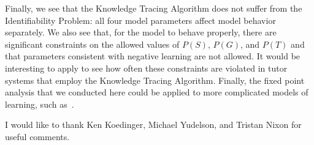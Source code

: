 \documentclass{acmlarge-edm}
\begin{document}
Finally, we see that the Knowledge Tracing Algorithm does not suffer from
the Identifiability Problem:  all four model parameters
affect model behavior separately.  
We also see that, for the model to behave properly,  there are 
significant constraints on the allowed values of $P(S)$, $P(G)$, and $P(T)$
and that parameters consistent with negative learning are not allowed.
It would be interesting to apply to see how often these constraints are
violated in tutor systems that employ the Knowledge Tracing Algorithm.
Finally, the fixed point analysis that we conducted here could be
applied to more complicated models of learning, such 
as~\cite{baker_improving_2008,lee_impact_2012}.


\begin{acks}
I would like to thank Ken Koedinger, Michael Yudelson, and Tristan Nixon for
useful comments.
\end{acks}


\end{document}
